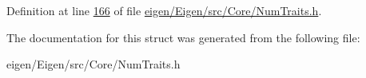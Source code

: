 Definition at line \hyperlink{eigen_2_eigen_2src_2_core_2_num_traits_8h_source_l00166}{166} of file \hyperlink{eigen_2_eigen_2src_2_core_2_num_traits_8h_source}{eigen/\+Eigen/src/\+Core/\+Num\+Traits.\+h}.



The documentation for this struct was generated from the following file\+:\begin{DoxyCompactItemize}
\item 
eigen/\+Eigen/src/\+Core/\+Num\+Traits.\+h\end{DoxyCompactItemize}
